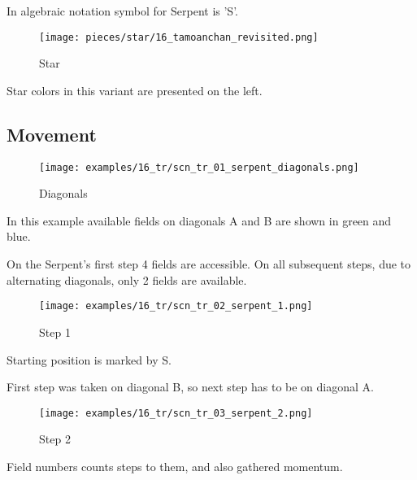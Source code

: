 In algebraic notation symbol for Serpent is ’S’.

\noindent
\begin{wrapfigure}{l}{0.4\textwidth}
\centering
\texttt{[image: pieces/star/16\_tamoanchan\_revisited.png]}
\caption{Star}
\label{fig:star/16_tamoanchan_revisited}
\end{wrapfigure}
Star colors in this variant are presented on the left.

\clearpage %

\subsection*{Movement}

\noindent
\begin{wrapfigure}[7]{l}{0.4\textwidth}
\centering
\texttt{[image: examples/16\_tr/scn\_tr\_01\_serpent\_diagonals.png]}
\caption{Diagonals}
\label{fig:scn_tr_01_serpent_diagonals}
\end{wrapfigure}
In this example available fields on diagonals A and B are shown in green
and blue.

On the Serpent's first step 4 fields are accessible. On all subsequent
steps, due to alternating diagonals, only 2 fields are available.

\vspace*{0.07\textheight}
\noindent
\begin{wrapfigure}[4]{l}{0.4\textwidth}
\centering
\texttt{[image: examples/16\_tr/scn\_tr\_02\_serpent\_1.png]}
\caption{Step 1}
\label{fig:scn_tr_02_serpent_1}
\end{wrapfigure}
Starting position is marked by S.

First step was taken on diagonal B, so next step has to be on diagonal A.

\vspace*{0.15\textheight}
\noindent
\begin{wrapfigure}[5]{l}{0.4\textwidth}
\centering
\texttt{[image: examples/16\_tr/scn\_tr\_03\_serpent\_2.png]}
\caption{Step 2}
\label{fig:scn_tr_03_serpent_2}
\end{wrapfigure}
Field numbers counts steps to them, and also gathered momentum.

